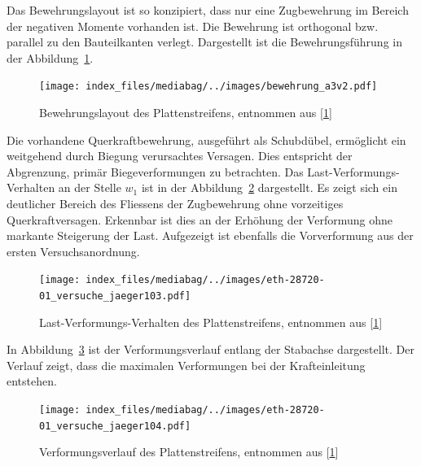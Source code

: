 \documentclass[
  12pt,
  letterpaper,
  egregdoesnotlikesansseriftitles]{scrreprt}
\begin{document}
Das Bewehrungslayout ist so konzipiert, dass nur eine Zugbewehrung im
Bereich der negativen Momente vorhanden ist. Die Bewehrung ist
orthogonal bzw. parallel zu den Bauteilkanten verlegt. Dargestellt ist
die Bewehrungsführung in der Abbildung~\ref{fig-bewehrung_a3v2}.

\begin{figure}[H]

{\centering \texttt{[image: index\_files/mediabag/../images/bewehrung\_a3v2.pdf]}

}

\caption{\label{fig-bewehrung_a3v2}Bewehrungslayout des
Plattenstreifens, entnommen aus
{[}\protect\hyperlink{ref-Jaeger2006}{1}{]}}

\end{figure}

Die vorhandene Querkraftbewehrung, ausgeführt als Schubdübel, ermöglicht
ein weitgehend durch Biegung verursachtes Versagen. Dies entspricht der
Abgrenzung, primär Biegeverformungen zu betrachten. Das
Last-Verformungs-Verhalten an der Stelle \(w_1\) ist in der
Abbildung~\ref{fig-lastverformung_a3v2} dargestellt. Es zeigt sich ein
deutlicher Bereich des Fliessens der Zugbewehrung ohne vorzeitiges
Querkraftversagen. Erkennbar ist dies an der Erhöhung der Verformung
ohne markante Steigerung der Last. Aufgezeigt ist ebenfalls die
Vorverformung aus der ersten Versuchsanordnung.

\begin{figure}[H]

{\centering \texttt{[image: index\_files/mediabag/../images/eth-28720-01\_versuche\_jaeger103.pdf]}

}

\caption{\label{fig-lastverformung_a3v2}Last-Verformungs-Verhalten des
Plattenstreifens, entnommen aus
{[}\protect\hyperlink{ref-Jaeger2006}{1}{]}}

\end{figure}

In Abbildung~\ref{fig-verformungsverlauf_a3v2} ist der
Verformungsverlauf entlang der Stabachse dargestellt. Der Verlauf zeigt,
dass die maximalen Verformungen bei der Krafteinleitung entstehen.

\begin{figure}[H]

{\centering \texttt{[image: index\_files/mediabag/../images/eth-28720-01\_versuche\_jaeger104.pdf]}

}

\caption{\label{fig-verformungsverlauf_a3v2}Verformungsverlauf des
Plattenstreifens, entnommen aus
{[}\protect\hyperlink{ref-Jaeger2006}{1}{]}}

\end{figure}
\end{document}
